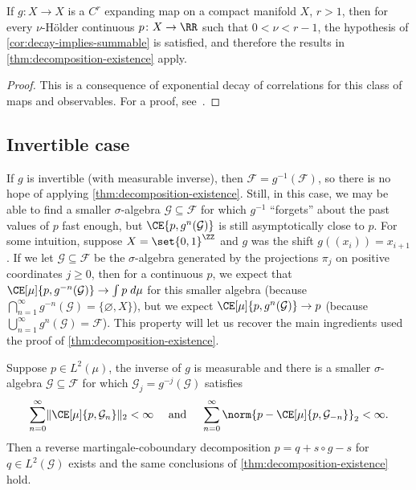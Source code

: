 \documentclass[../main]{subfiles}
\begin{document}
\begin{corollary}
  If \(g \colon X \to X\) is a \(C^r\) expanding map on a compact manifold \(X\), \(r > 1\), then for every \(\nu\)-Hölder continuous \(p \colon X \to \RR\) such that \(0 < \nu < r - 1\), the hypothesis of \cref{cor:decay-implies-summable} is satisfied, and therefore the results in \cref{thm:decomposition-existence} apply.
\end{corollary}

\begin{proof}
  This is a consequence of exponential decay of correlations for this class of maps and observables. For a proof, see~\cite[Proposition 2.7]{vianaStochasticDynamicsDeterministic1997}.
\end{proof}

\subsection{Invertible case}

If \(g\) is invertible (with measurable inverse), then \(\mathcal{F} = g^{-1}(\mathcal{F})\), so there is no hope of applying \cref{thm:decomposition-existence}. Still, in this case, we may be able to find a smaller \(\sigma\)-algebra \(\mathcal{G} \subseteq \mathcal{F}\) for which \(g^{-1}\) ``forgets'' about the past values of \(p\) fast enough, but \(\CE{p,g^n(\mathcal{G})}\) is still asymptotically close to \(p\).
For some intuition, suppose \(X = \set{0,1}^{\ZZ}\) and \(g\) was the shift \(g((x_i)) = x_{i + 1}\). If we let \(\mathcal{G} \subseteq \mathcal{F}\) be the \(\sigma\)-algebra generated by the projections \(\pi_j\) on positive coordinates \(j \ge 0\), then for a continuous \(p\), we expect that \(\CE[\mu]{p,g^{-n}(\mathcal{G})} \to \int p \;d\mu\) for this smaller algebra (because \(\bigcap_{n = 1}^{\infty} g^{-n}(\mathcal{G}) = \{\varnothing, X\}\)), but we expect \(\CE[\mu]{p,g^{n}(\mathcal{G})} \to p\) (because \(\bigcup_{n = 1}^{\infty} g^{n}(\mathcal{G}) = \mathcal{F}\)). This property will let us recover the main ingredients used the proof of \cref{thm:decomposition-existence}.

\begin{theorem}\label{thm:decomposition-existence-inv}
  Suppose \(p \in L^2(\mu)\), the inverse of \(g\) is measurable and there is a smaller \(\sigma\)-algebra \(\mathcal{G} \subseteq \mathcal{F}\) for which \(\mathcal{G}_j = g^{-j}(\mathcal{G})\) satisfies
  \begin{equation*}
    \sum_{n = 0}^{\infty} \lVert \CE[\mu]{p, \mathcal{G}_n} \rVert_2 < \infty\quad \text{ and }
    \quad \sum_{n = 0}^{\infty} \norm{p - \CE[\mu]{p,\mathcal{G}_{-n}}}_2 < \infty.
  \end{equation*}
  Then a reverse martingale-coboundary decomposition \(p = q + s \circ g - s\) for \(q \in L^2(\mathcal{G})\) exists and the same conclusions of \cref{thm:decomposition-existence} hold.
\end{theorem}
\end{document}
